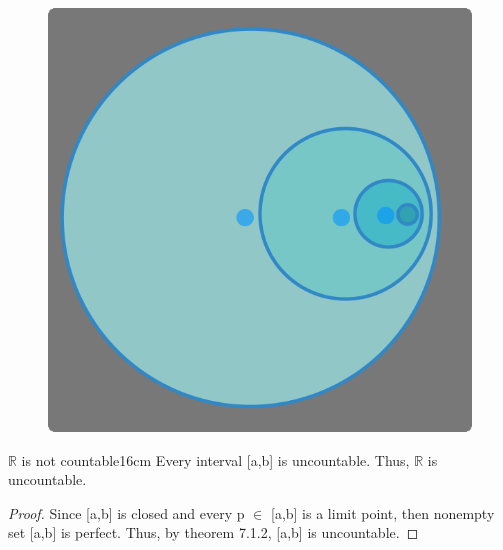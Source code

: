 	\begin{figure}[h]
		\centering
		\includegraphics[scale=0.3]{Images/7.1.2.png}
	\end{figure}



	\begin{corollary}{$\mathbb{R}$ is not countable}{16cm}
		Every interval [a,b] is uncountable.
		Thus, $\mathbb{R}$ is uncountable.
	\end{corollary}
	
	\begin{proof}
		Since [a,b] is closed and every p $\in$ [a,b] is a limit point,
		then nonempty set [a,b] is perfect.
		Thus, by {\color{red} theorem 7.1.2}, [a,b] is uncountable.
	\end{proof}

	\newpage



